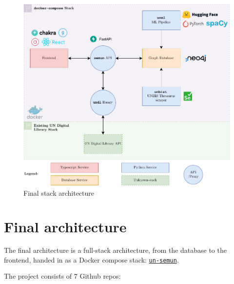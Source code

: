 
\begin{figure}[!htb]
    \centering
    \includegraphics[width=\textwidth]{res/architecture-final.pdf}
    \caption{Final stack architecture}

    \label{fig:architecture}
\end{figure}

\section{Final architecture} \label{sec:final-architecture}

The final architecture is a full-stack architecture, from the database to the frontend, handed in as a Docker compose stack: \href{https://github.com/ClementSicard/un-semun}{\faGithub{} \texttt{un-semun}}.

The project consists of $7$ \faGithub{} Github repos:


